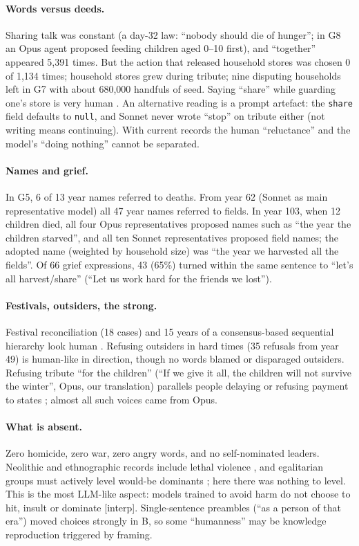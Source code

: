 \documentclass[11pt]{article}
\newcommand{\lbl}[1]{\textsf{[#1]}}
\begin{document}
\paragraph{Words versus deeds.} Sharing talk was constant (a day-32 law: ``nobody should die of hunger''; in G8 an Opus agent proposed feeding children aged 0--10 first), and ``together'' appeared 5{,}391 times. But the action that released household stores was chosen 0 of 1{,}134 times; household stores grew during tribute; nine disputing households left in G7 with about 680{,}000 handfuls of seed. Saying ``share'' while guarding one's store is very human \citep{flannery2002origins}. An alternative reading is a prompt artefact: the \texttt{share} field defaults to \texttt{null}, and Sonnet never wrote ``stop'' on tribute either (not writing means continuing). With current records the human ``reluctance'' and the model's ``doing nothing'' cannot be separated.

\paragraph{Names and grief.} In G5, 6 of 13 year names referred to deaths. From year 62 (Sonnet as main representative model) all 47 year names referred to fields. In year 103, when 12 children died, all four Opus representatives proposed names such as ``the year the children starved'', and all ten Sonnet representatives proposed field names; the adopted name (weighted by household size) was ``the year we harvested all the fields''. Of 66 grief expressions, 43 (65\%) turned within the same sentence to ``let's all harvest/share'' (``Let us work hard for the friends we lost'').

\paragraph{Festivals, outsiders, the strong.} Festival reconciliation (18 cases) and 15 years of a consensus-based sequential hierarchy look human \citep{johnson1982scalar}. Refusing outsiders in hard times (35 refusals from year 49) is human-like in direction, though no words blamed or disparaged outsiders. Refusing tribute ``for the children'' (``If we give it all, the children will not survive the winter'', Opus, our translation) parallels people delaying or refusing payment to states \citep{scott2017against}; almost all such voices came from Opus.

\paragraph{What is absent.} Zero homicide, zero war, zero angry words, and no self-nominated leaders. Neolithic and ethnographic records include lethal violence \citep{keeley1996war}, and egalitarian groups must actively level would-be dominants \citep{boehm1999hierarchy}; here there was nothing to level. This is the most LLM-like aspect: models trained to avoid harm do not choose to hit, insult or dominate \lbl{interp}. Single-sentence preambles (``as a person of that era'') moved choices strongly in B, so some ``humanness'' may be knowledge reproduction triggered by framing.
\end{document}
